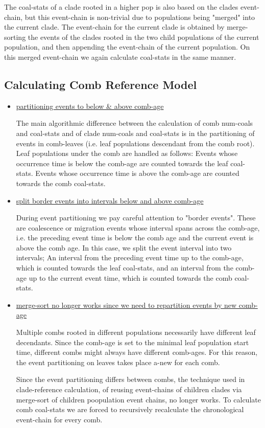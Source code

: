 \documentclass[11pt]{article}
\begin{document}
\begin{itemize}
The coal-stats of a clade rooted in a higher pop is also based on the clades event-chain, but this event-chain is non-trivial due to populations being "merged" into the current clade. The event-chain for the current clade is obtained by merge-sorting the events of the clades rooted in the two child populations of the current population, and then appending the event-chain of the current population. On this merged event-chain we again calculate coal-stats in the same manner.



\end{itemize}
\subsection{Calculating Comb Reference Model}
\begin{itemize}

\item \underline{partitioning events to below \& above comb-age}

The main algorithmic difference between the calculation of comb num-coals and coal-stats and of clade num-coals and coal-stats is in the partitioning of events in comb-leaves (i.e. leaf populations descendant from the comb root). Leaf populations under the comb are handled as follows: Events whose occurrence time is below the comb-age are counted towards the leaf coal-stats. Events whose occurrence time is above the comb-age are counted towards the comb coal-stats. 

\item \underline{split border events into intervals below and above comb-age}

During event partitioning we pay careful attention to "border events". These are coalescence or migration events whose interval spans across the comb-age, i.e. the preceding event time is below the comb age and the current event is above the comb age. In this case, we split the event interval into two intervals; An interval from the preceding event time up to the comb-age, which is counted towards the leaf coal-stats, and an interval from the comb-age up to the current event time, which is counted towards the comb coal-stats.

\item \underline{merge-sort no longer works since we need to repartition events by new comb-age}

Multiple combs rooted in different populations necessarily have different leaf decendants. Since the comb-age is set to the minimal leaf population start time, different combs might always have different comb-ages. For this reason, the event partitioning on leaves takes place a-new for each comb.

Since the event partitioning differs between combs, the technique used in clade-reference calculation, of reusing event-chains of children clades via merge-sort of children poopulation event chains, no longer works. To calculate comb coal-stats we are forced to recursively recalculate the chronological event-chain for every comb.

\end{itemize}
\end{document}

